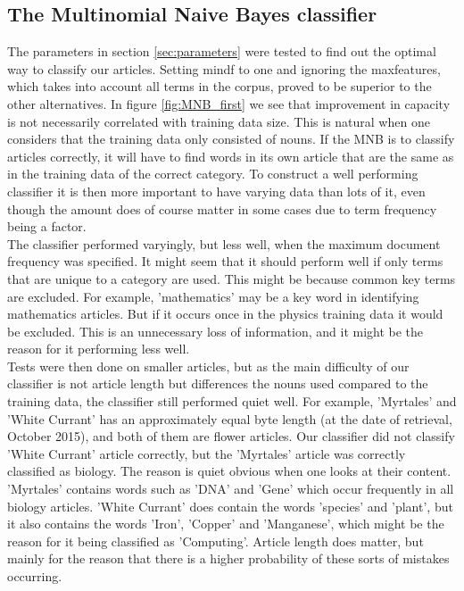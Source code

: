 \documentclass[a4paper]{article}
\begin{document}
\subsection{The Multinomial Naive Bayes classifier}



The parameters in section \ref{sec:parameters} were tested to find out the optimal way to classify our articles. Setting min\textunderscore df to one and ignoring the max\textunderscore features, which takes into account all terms in the corpus, proved to be superior to the other alternatives. In figure \ref{fig:MNB_first} we see that improvement in capacity is not necessarily correlated with training data size. This is natural when one considers that the training data only consisted of nouns. If the MNB is to classify articles correctly, it will have to find words in its own article that are the same as in the training data of the correct category. To construct a well performing classifier it is then more important to have varying data than lots of it, even though the amount does of course matter in some cases due to term frequency being a factor.\\

\noindent The classifier performed varyingly, but less well, when the maximum document frequency was specified. It might seem that it should perform well if only terms that are unique to a category are used. This might be because common key terms are excluded. For example, 'mathematics' may be a key word in identifying mathematics articles. But if it occurs once in the physics training data it would be excluded. This is an unnecessary loss of information, and it might be the reason for it performing less well. \\

\noindent Tests were then done on smaller articles, but as the main difficulty of our classifier is not article length but differences the nouns used compared to the training data, the classifier still performed quiet well. For example, 'Myrtales' and 'White Currant' has an approximately equal byte length (at the date of retrieval, October 2015), and both of them are flower articles. Our classifier did not classify 'White Currant' article correctly, but the 'Myrtales' article was correctly classified as biology. The reason is quiet obvious when one looks at their content. 'Myrtales' contains words such as 'DNA' and 'Gene' which occur frequently in all biology articles. 'White Currant' does contain the words 'species' and 'plant', but it also contains the words 'Iron', 'Copper' and 'Manganese', which might be the reason for it being classified as 'Computing'. Article length does matter, but mainly for the reason that there is a higher probability of these sorts of mistakes occurring.
\end{document}
